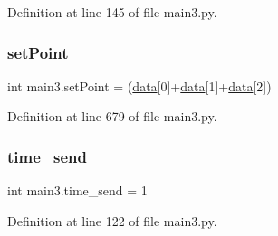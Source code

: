 Definition at line 145 of file main3.\+py.

\mbox{\label{namespacemain3_a248f67a00d1a70af3906de327bd341e2}} 
\subsubsection{\texorpdfstring{set\+Point}{setPoint}}
{\footnotesize\ttfamily int main3.\+set\+Point = (\hyperlink{namespacemain3_af3b593054c807ee934bbbca0f4964a15}{data}\mbox{[}0\mbox{]}+\hyperlink{namespacemain3_af3b593054c807ee934bbbca0f4964a15}{data}\mbox{[}1\mbox{]}+\hyperlink{namespacemain3_af3b593054c807ee934bbbca0f4964a15}{data}\mbox{[}2\mbox{]})}



Definition at line 679 of file main3.\+py.

\mbox{\label{namespacemain3_aefc1f762f0a9b87f47694cb1310cd460}} 
\subsubsection{\texorpdfstring{time\+\_\+send}{time\_send}}
{\footnotesize\ttfamily int main3.\+time\+\_\+send = 1}



Definition at line 122 of file main3.\+py.

